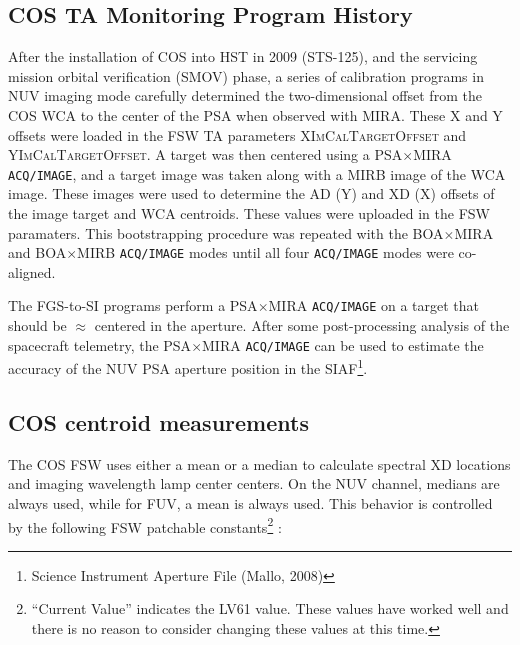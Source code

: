 \subsection{COS TA Monitoring Program History}\label{subsec:History}
After the installation of COS into HST in 2009 (STS-125), and the
servicing mission orbital verification (SMOV) phase,
a series of calibration programs in NUV imaging mode carefully determined the two-dimensional offset from the COS WCA to the center of the PSA when observed with MIRA.
These X and Y offsets were loaded in the FSW TA parameters \textsc{XImCalTargetOffset} and \textsc{YImCalTargetOffset}.
A target was then centered using a PSA$\times$MIRA \texttt{ACQ/IMAGE}, and a target image was taken along with a MIRB image
of the WCA image. These images were used to determine the AD (Y) and XD (X) offsets of the image target and WCA centroids.
These values were uploaded in the FSW paramaters. This bootstrapping procedure was repeated with the BOA$\times$MIRA
and BOA$\times$MIRB \texttt{ACQ/IMAGE} modes until all four \texttt{ACQ/IMAGE} modes were co-aligned.

The FGS-to-SI programs perform a PSA$\times$MIRA \texttt{ACQ/IMAGE} on a target that should be $\approx$ centered in the aperture.
After some post-processing analysis of the spacecraft telemetry, the PSA$\times$MIRA \texttt{ACQ/IMAGE} can be used to estimate the accuracy of the NUV PSA aperture position in the SIAF\footnote{Science Instrument Aperture File (Mallo, 2008)}.


\subsection{COS centroid measurements}
	The COS FSW uses either a mean or a median to calculate spectral XD locations and imaging wavelength lamp center centers.
On the NUV channel, medians are always used, while for FUV, a mean is always used. This
behavior is controlled by the following FSW patchable constants\footnote{``Current Value'' indicates the LV61 value. These values have worked
well and there is no reason to consider changing these values at this time.} :\\

